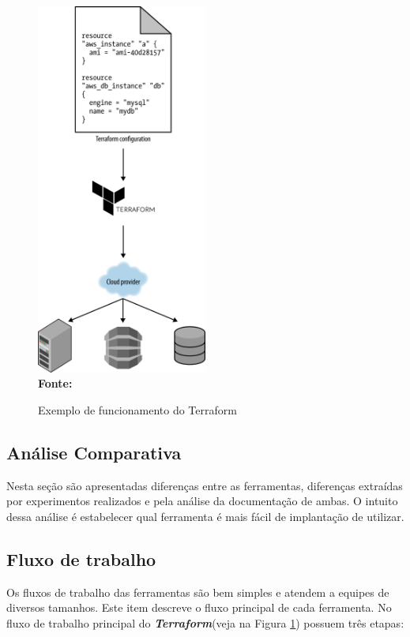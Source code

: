   \begin{figure}[ht]
	\centering	
	\caption[\hspace{0.1cm}Exemplo de funcionamento do Terraform]{Exemplo de funcionamento do Terraform}
	\vspace{-0.4cm}
	\includegraphics[width=0.5\textwidth]{figuras/terraform-working.png}
	 \vspace{-0.2cm}
	\\\textbf{\footnotesize Fonte: \cite{oreilly}}
	\label{fig:figura7}
\end{figure}
\vspace{-0.5cm}


\subsection{ Análise Comparativa }

Nesta seção são apresentadas diferenças entre as ferramentas, diferenças extraídas por experimentos realizados e pela análise da documentação de ambas. O intuito dessa análise é estabelecer qual ferramenta é mais fácil de implantação de utilizar.

\subsection{Fluxo de trabalho}
Os fluxos de trabalho  das ferramentas são bem simples e atendem a equipes de diversos tamanhos. Este item descreve o fluxo principal de cada ferramenta. No fluxo de trabalho principal do \textbf{\textit{Terraform}}(veja na Figura \ref{fig:figura7}) possuem três etapas: 

